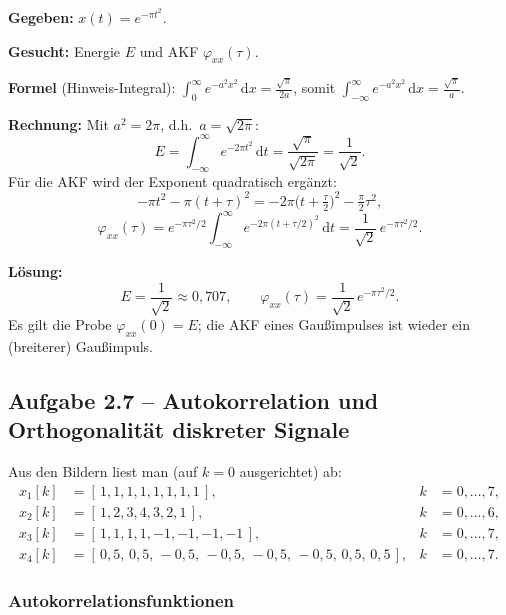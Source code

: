 \begin{beispiel}

\textbf{Gegeben:} $x(t)=e^{-\pi t^2}$.

\textbf{Gesucht:} Energie $E$ und AKF $\varphi_{xx}(\tau)$.

\textbf{Formel} (Hinweis-Integral): $\int_0^{\infty} e^{-a^2 x^2}\,\mathrm{d}x=\tfrac{\sqrt{\pi}}{2a}$,
somit $\int_{-\infty}^{\infty} e^{-a^2 x^2}\,\mathrm{d}x=\tfrac{\sqrt{\pi}}{a}$.

\textbf{Rechnung:} Mit $a^2=2\pi$, d.h.\ $a=\sqrt{2\pi}$:
$$
E = \int_{-\infty}^{\infty} e^{-2\pi t^2}\,\mathrm{d}t
= \frac{\sqrt{\pi}}{\sqrt{2\pi}} = \frac{1}{\sqrt{2}}.
$$
Für die AKF wird der Exponent quadratisch ergänzt:
$$
-\pi t^2 - \pi(t+\tau)^2 = -2\pi\Big(t+\tfrac{\tau}{2}\Big)^2 - \tfrac{\pi}{2}\tau^2,
$$
$$
\varphi_{xx}(\tau) = e^{-\pi\tau^2/2}\!\int_{-\infty}^{\infty}\! e^{-2\pi(t+\tau/2)^2}\,\mathrm{d}t
= \frac{1}{\sqrt{2}}\,e^{-\pi\tau^2/2}.
$$

\textbf{Lösung:}
$$
\boxed{\;E = \frac{1}{\sqrt{2}}\approx 0{,}707,\qquad
\varphi_{xx}(\tau) = \frac{1}{\sqrt{2}}\,e^{-\pi\tau^2/2}.\;}
$$
Es gilt die Probe $\varphi_{xx}(0)=E$; die AKF eines Gaußimpulses ist wieder ein
(breiterer) Gaußimpuls.
\end{beispiel}

\subsection*{Aufgabe 2.7 – Autokorrelation und Orthogonalität diskreter Signale}

Aus den Bildern liest man (auf $k=0$ ausgerichtet) ab:
$$
\begin{aligned}
x_1[k] &= [\,1,1,1,1,1,1,1,1\,], & k&=0,\ldots,7, \\
x_2[k] &= [\,1,2,3,4,3,2,1\,], & k&=0,\ldots,6, \\
x_3[k] &= [\,1,1,1,1,-1,-1,-1,-1\,], & k&=0,\ldots,7, \\
x_4[k] &= [\,0{,}5,\,0{,}5,\,-0{,}5,\,-0{,}5,\,-0{,}5,\,-0{,}5,\,0{,}5,\,0{,}5\,], & k&=0,\ldots,7.
\end{aligned}
$$

\subsubsection*{Autokorrelationsfunktionen}

